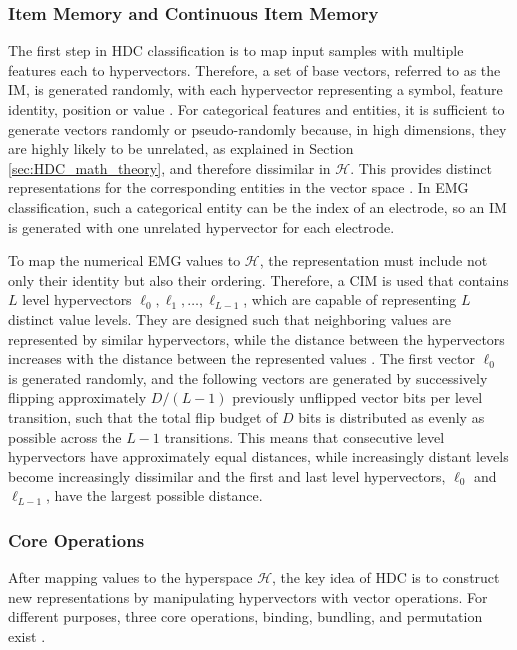     \subsubsection{Item Memory and Continuous Item Memory}
    The first step in HDC classification is to map input samples with multiple features each to hypervectors. Therefore, a set of base vectors, referred to as the \ac{IM}, is generated randomly, with each hypervector representing a symbol, feature identity, position or value \cite{kanerva_hyperdimensional_2009}. For categorical features and entities, it is sufficient to generate vectors randomly or pseudo-randomly because, in high dimensions, they are highly likely to be unrelated, as explained in Section \ref{sec:HDC_math_theory}, and therefore dissimilar in $\mathcal{H}$. This provides distinct representations for the corresponding entities in the vector space \cite{ge_classification_2020}. In EMG classification, such a categorical entity can be the index of an electrode, so an \ac{IM} is generated with one unrelated hypervector for each electrode.
    
    To map the numerical EMG values to $\mathcal{H}$, the representation must include not only their identity but also their ordering. Therefore, a \ac{CIM} is used that contains $L$ level hypervectors $\boldsymbol{\ell}_0, \boldsymbol{\ell}_1, \ldots, \boldsymbol{\ell}_{L-1}$, which are capable of representing $L$ distinct value levels. They are designed such that neighboring values are represented by similar hypervectors, while the distance between the hypervectors increases with the distance between the represented values \cite{ge_classification_2020}. The first vector $\boldsymbol{\ell}_0$ is generated randomly, and the following vectors are generated by successively flipping approximately $D/(L-1)$ previously unflipped vector bits per level transition, such that the total flip budget of $D$ bits is distributed as evenly as possible across the $L-1$ transitions.
    This means that consecutive level hypervectors have approximately equal distances, while increasingly distant levels become increasingly dissimilar and the first and last level hypervectors, $\boldsymbol{\ell}_0$ and $\boldsymbol{\ell}_{L-1}$, have the largest possible distance.
    
    \subsubsection{Core Operations}
    After mapping values to the hyperspace $\mathcal{H}$, the key idea of HDC is to construct new representations by manipulating hypervectors with vector operations. For different purposes, three core operations, binding, bundling, and permutation exist \cite{kanerva_hyperdimensional_2009}.
    
